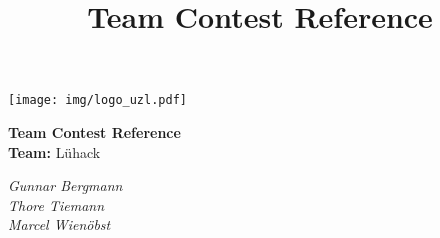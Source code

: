\documentclass[10pt,a4paper,ngerman,oneside,]{article}
\title{Team Contest Reference}
\author{\university}
\newcommand\teamname{Lühack}
\newcommand\teammembers{Gunnar Bergmann\\ Thore Tiemann\\ Marcel Wienöbst}
\begin{document}
\vspace{-5mm}
\begin{center}
	\begin{minipage}{0.3\textwidth}
	  \texttt{[image: img/logo\_uzl.pdf]}
    \end{minipage}
	\begin{minipage}{0.35\textwidth}
      \begin{center}
	    \LARGE{\bfseries Team Contest Reference}\\
        \textbf{Team:} {\teamname}
      \end{center}
    \end{minipage}
	\begin{minipage}{0.3\textwidth}
      \flushright
      \itshape\teammembers
    \end{minipage}
\end{center}
\thispagestyle{fancy}
\tableofcontents
\end{document}
